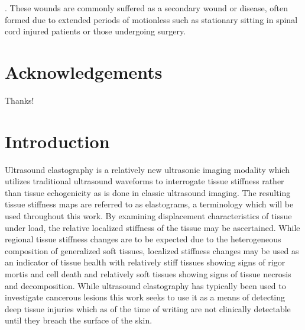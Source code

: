 \documentclass[12pt]{book}
\begin{document}
	. These wounds are commonly suffered as a secondary wound or disease, often formed due to extended periods of motionless such as stationary sitting in spinal cord injured patients or those undergoing surgery. 

\onehalfspacing
\chapter*{Acknowledgements}
	Thanks!

\tableofcontents

\listoftables

\listoffigures

\pagebreak

\chapter{Introduction}
	Ultrasound elastography is a relatively new ultrasonic imaging modality which utilizes traditional ultrasound waveforms to interrogate tissue stiffness rather than tissue echogenicity as is done in classic ultrasound imaging. The resulting tissue stiffness maps are referred to as elastograms, a terminology which will be used throughout this work. By examining displacement characteristics of tissue under load, the relative localized stiffness of the tissue may be ascertained. While regional tissue stiffness changes are to be expected due to the heterogeneous composition of generalized soft tissues, localized stiffness changes may be used as an indicator of tissue health \cite{gefen09} with relatively stiff tissues showing signs of rigor mortis and cell death and relatively soft tissues showing signs of tissue necrosis and decomposition. While ultrasound elastography has typically been used to investigate cancerous lesions this work seeks to use it as a means of detecting deep tissue injuries which as of the time of writing are not clinically detectable until they breach the surface of the skin.
\end{document}
